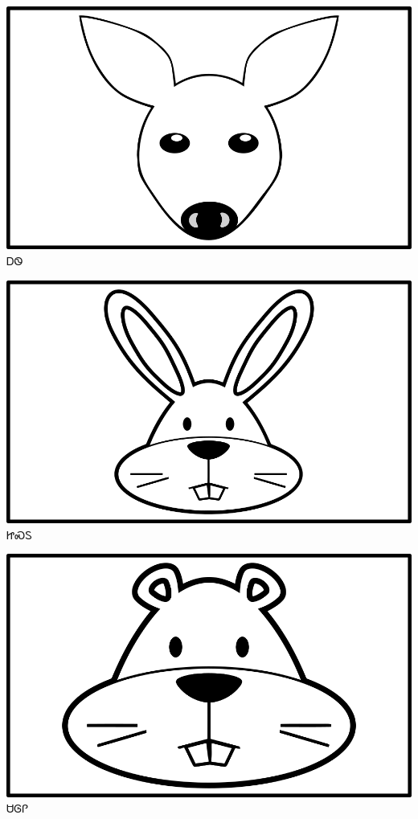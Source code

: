 \documentclass[avery5371]{flashcards}%
\begin{document}
\begin{flashcard}{
\includegraphics[width=0.95\columnwidth,height=.51\columnwidth,keepaspectratio]{../artwork/objects-animate/ahwi}
}\Huge ᎠᏫ
\end{flashcard}

\begin{flashcard}{
\includegraphics[width=0.95\columnwidth,height=.51\columnwidth,keepaspectratio]{../artwork/objects-animate/jisdu}
}\Huge ᏥᏍᏚ
\end{flashcard}

\begin{flashcard}{
\includegraphics[width=0.95\columnwidth,height=.51\columnwidth,keepaspectratio]{../artwork/objects-animate/saloli}
}\Huge ᏌᎶᎵ
\end{flashcard}
\end{document}
